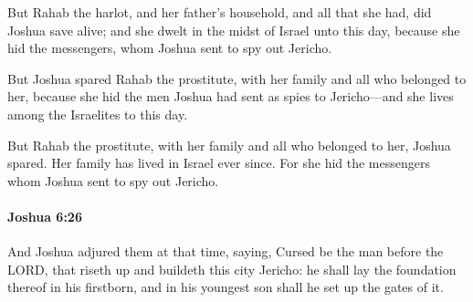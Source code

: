 			\begin{versebox}
					\item[BHS] 
					\item[ASV] But Rahab the harlot, and her father's household, and all that she had, did Joshua save alive; and she dwelt in the midst of Israel unto this day, because she hid the messengers, whom Joshua sent to spy out Jericho.
					\item[NIV] But Joshua spared Rahab the prostitute, with her family and all who belonged to her, because she hid the men Joshua had sent as spies to Jericho—and she lives among the Israelites to this day.
					\item[NRSV] But Rahab the prostitute, with her family and all who belonged to her, Joshua spared. Her family has lived in Israel ever since. For she hid the messengers whom Joshua sent to spy out Jericho.
			\end{versebox}

		\paragraph{Joshua 6:26} %
			\label{JOSHUA-6-26}

			And Joshua adjured them at that time, saying, Cursed be the man before the LORD, that riseth up and buildeth this city Jericho: he shall lay the foundation thereof in his firstborn, and in his youngest son shall he set up the gates of it.

